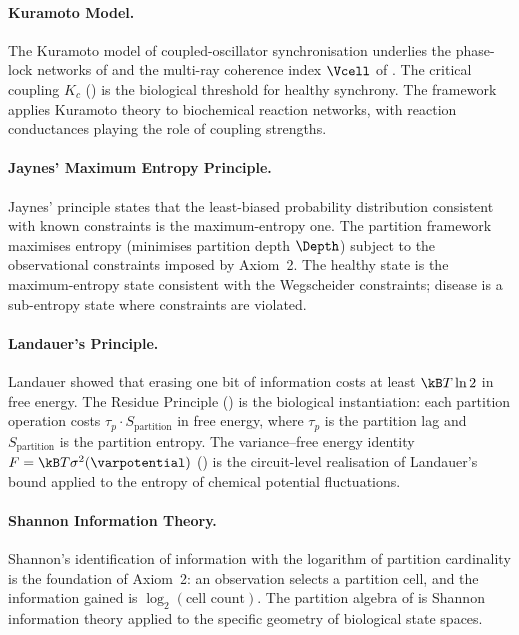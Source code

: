 \paragraph{Kuramoto Model.}
The Kuramoto model of coupled-oscillator synchronisation \citep{Kuramoto1984}
underlies the phase-lock networks of  and the
multi-ray coherence index $\Vcell$ of .  The critical
coupling $K_c$ () is the biological threshold for
healthy synchrony.  The framework applies Kuramoto theory to biochemical
reaction networks, with reaction conductances playing the role of coupling
strengths.

\paragraph{Jaynes' Maximum Entropy Principle.}
Jaynes' principle \citep{Jaynes1957} states that the least-biased probability
distribution consistent with known constraints is the maximum-entropy one.
The partition framework maximises entropy (minimises partition depth $\Depth$)
subject to the observational constraints imposed by Axiom~2.  The healthy
state is the maximum-entropy state consistent with the Wegscheider constraints;
disease is a sub-entropy state where constraints are violated.

\paragraph{Landauer's Principle.}
Landauer \citep{Landauer1961} showed that erasing one bit of information
costs at least $\kB T \ln 2$ in free energy.  The Residue Principle
() is the biological instantiation: each partition operation
costs $\tau_p \cdot S_{\mathrm{partition}}$ in free energy, where $\tau_p$ is
the partition lag and $S_{\mathrm{partition}}$ is the partition entropy.  The
variance--free energy identity $F = \kB T \sigma^2(\varpotential)$
() is the circuit-level realisation of
Landauer's bound applied to the entropy of chemical potential fluctuations.

\paragraph{Shannon Information Theory.}
Shannon's identification of information with the logarithm of partition
cardinality \citep{Shannon1948} is the foundation of Axiom~2: an observation
selects a partition cell, and the information gained is $\log_2(\text{cell count})$.
The partition algebra of  is Shannon information
theory applied to the specific geometry of biological state spaces.

